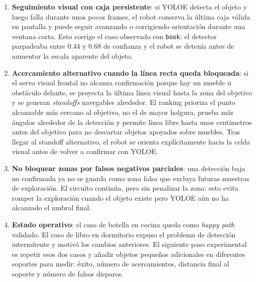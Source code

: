 \documentclass[11pt,a4paper]{article}
\begin{document}
\begin{enumerate}
        el flujo cargando el modelo al llegar. La confirmación alta se carga
        sólo cuando es necesaria, manteniendo separado el umbral de aviso
        (\texttt{0.40}) del umbral final (\texttt{0.80}).
  \item \textbf{Seguimiento visual con caja persistente}: si YOLOE detecta el
        objeto y luego falla durante unos pocos frames, el robot conserva la
        última caja válida en pantalla y puede seguir avanzando o corrigiendo
        orientación durante una ventana corta. Esto corrige el caso observado
        con \texttt{book}: el detector parpadeaba entre 0.44 y 0.68 de
        confianza y el robot se detenía antes de aumentar la escala aparente
        del objeto.
  \item \textbf{Acercamiento alternativo cuando la línea recta queda bloqueada}:
        si el servo visual frontal no alcanza confirmación porque hay un mueble
        u obstáculo delante, se proyecta la última línea visual hasta la zona
        del objetivo y se generan \emph{standoffs} navegables alrededor. El
        ranking prioriza el punto alcanzable más cercano al objetivo, no el de
        mayor holgura, prueba más ángulos alrededor de la detección y permite
        línea libre hasta unos centímetros antes del objetivo para no descartar
        objetos apoyados sobre muebles. Tras llegar al standoff alternativo, el
        robot se orienta explícitamente hacia la celda visual antes de volver a
        confirmar con YOLOE.
  \item \textbf{No bloquear zonas por falsos negativos parciales}: una
        detección baja no confirmada ya no se guarda como zona falsa que excluya
        futuras muestras de exploración. El circuito continúa, pero sin
        penalizar la zona: esto evita romper la exploración cuando el objeto
        existe pero YOLOE aún no ha alcanzado el umbral final.
  \item \textbf{Estado operativo}: el caso de botella en cocina queda como
        \emph{happy path} validado. El caso de libro en dormitorio expuso el
        problema de detección intermitente y motivó los cambios anteriores. El
        siguiente paso experimental es repetir esos dos casos y añadir objetos
        pequeños adicionales en diferentes soportes para medir: éxito, número
        de acercamientos, distancia final al soporte y número de falsos
        disparos.
\end{enumerate}
\end{document}
